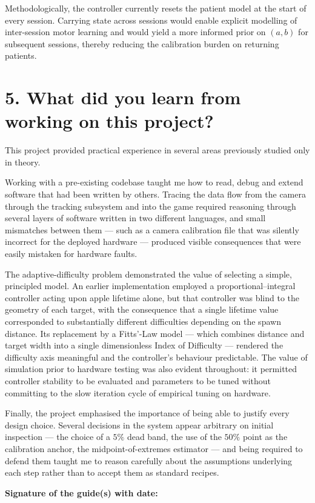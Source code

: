 \documentclass[11pt,a4paper]{article}
\begin{document}
Methodologically, the controller currently resets the patient model at the start of every session. Carrying state across sessions would enable explicit modelling of inter-session motor learning and would yield a more informed prior on $(a, b)$ for subsequent sessions, thereby reducing the calibration burden on returning patients.

\section*{5. What did you learn from working on this project?}

This project provided practical experience in several areas previously studied only in theory.

Working with a pre-existing codebase taught me how to read, debug and extend software that had been written by others. Tracing the data flow from the camera through the tracking subsystem and into the game required reasoning through several layers of software written in two different languages, and small mismatches between them --- such as a camera calibration file that was silently incorrect for the deployed hardware --- produced visible consequences that were easily mistaken for hardware faults.

The adaptive-difficulty problem demonstrated the value of selecting a simple, principled model. An earlier implementation employed a proportional--integral controller acting upon apple lifetime alone, but that controller was blind to the geometry of each target, with the consequence that a single lifetime value corresponded to substantially different difficulties depending on the spawn distance. Its replacement by a Fitts'-Law model --- which combines distance and target width into a single dimensionless Index of Difficulty --- rendered the difficulty axis meaningful and the controller's behaviour predictable. The value of simulation prior to hardware testing was also evident throughout: it permitted controller stability to be evaluated and parameters to be tuned without committing to the slow iteration cycle of empirical tuning on hardware.

Finally, the project emphasised the importance of being able to justify every design choice. Several decisions in the system appear arbitrary on initial inspection --- the choice of a $5\%$ dead band, the use of the $50\%$ point as the calibration anchor, the midpoint-of-extremes estimator --- and being required to defend them taught me to reason carefully about the assumptions underlying each step rather than to accept them as standard recipes.

\vspace{2em}

\noindent\textbf{Signature of the guide(s) with date:}
\end{document}
